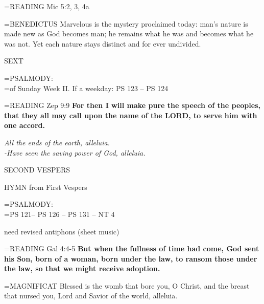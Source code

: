 \hangindent=\parindent \small{\uppercase{READING}}    Mic 5:2, 3, 4a \textbf{   \\}

\hangindent=\parindent \small{BENEDICTUS 	Marvelous is the mystery proclaimed today: man's nature is made new as God becomes man; he remains what he was and becomes what he was not. Yet each nature stays distinct and for ever undivided.\\}

\begin{flushleft}\normalsize SEXT\\\end{flushleft}

\hangindent=\parindent \small{PSALMODY:}\\
\hangindent=\parindent  of Sunday Week II. If a weekday: PS 123 -- PS 124\vspace{0.5em}

\hangindent=\parindent \small{\uppercase{READING}}    Zep 9:9 \textbf{   For then I will make pure the speech of the peoples, that they all may call upon the name of the LORD, to serve him with one accord.\\}

\begin{center}
\textit{All the ends of the earth, alleluia.\\
-Have seen the saving power of God, alleluia.}
\end{center}

\begin{flushleft}\normalsize SECOND VESPERS\\\end{flushleft}

HYMN from First Vespers

\hangindent=\parindent \small{PSALMODY:}\\
\hangindent=\parindent  PS 121-- PS 126 -- PS 131 -- NT 4\vspace{0.5em}

need revised antiphons (sheet music)

\hangindent=\parindent \small{\uppercase{READING}}    Gal 4:4-5 \textbf{   But when the fullness of time had come, God sent his Son, born of a woman, born under the law, to ransom those under the law, so that we might receive adoption.\\}

\hangindent=\parindent \small{MAGNIFICAT 	Blessed is the womb that bore you, O Christ, and the breast that nursed you, Lord and Savior of the world, alleluia.\\}
